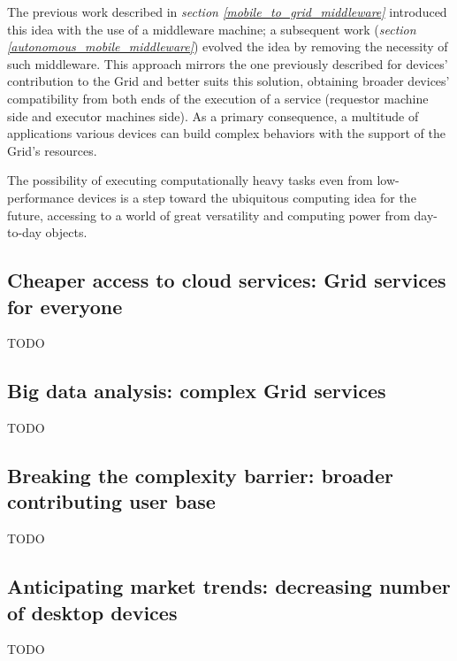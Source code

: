 The previous work described in \textit{section \ref{mobile_to_grid_middleware}} introduced this idea with the use of a middleware machine; a subsequent work (\textit{section \ref{autonomous_mobile_middleware}}) evolved the idea by removing the necessity
of such middleware. This approach mirrors the one previously described for devices' contribution to the Grid and better suits this solution, obtaining broader devices' compatibility from both ends of the execution of a service (requestor machine side and executor machines side). As a primary consequence, a multitude of applications various devices can build complex behaviors with the support of the Grid's resources.

The possibility of executing computationally heavy tasks even from low-performance devices is a step toward the ubiquitous computing idea for the future, accessing to a world of great versatility and computing power from day-to-day objects.

\subsection{Cheaper access to cloud services: Grid services for everyone}\label{cheaper_access_to_cloud_services}
TODO

\subsection{Big data analysis: complex Grid services}
TODO

\subsection{Breaking the complexity barrier: broader contributing user base}
TODO

\subsection{Anticipating market trends: decreasing number of desktop devices}
TODO